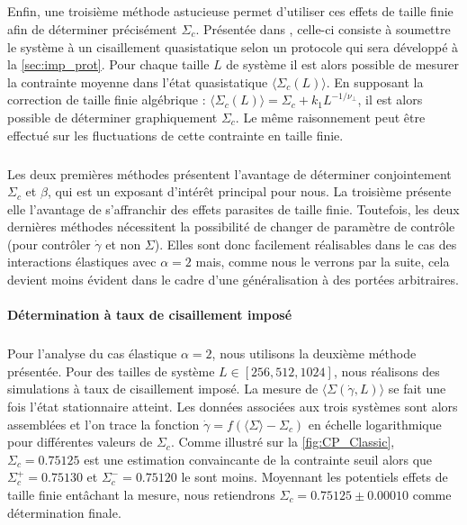\subparagraph{}Enfin, une troisième méthode astucieuse permet d'utiliser ces effets de taille finie afin de déterminer précisément $\Sigma_c$. Présentée dans \cite{lin_scaling_2014}, celle-ci consiste à soumettre le système à un cisaillement quasistatique selon un protocole qui sera développé à la \autoref{sec:imp_prot}. Pour chaque taille $L$ de système il est alors possible de mesurer la contrainte moyenne dans l'état quasistatique $\langle\Sigma_c (L)\rangle$. En supposant la correction de taille finie algébrique : $\langle\Sigma_c (L)\rangle = \Sigma_c+k_1 L^{-1/\nu_\perp}$, il est alors possible de déterminer graphiquement $\Sigma_c$. Le même raisonnement peut être effectué sur les fluctuations de cette contrainte en taille finie.

\subparagraph{}Les deux premières méthodes présentent l'avantage de déterminer conjointement $\Sigma_c$ et $\beta$, qui est un exposant d'intérêt principal pour nous. La troisième présente elle l'avantage de s'affranchir des effets parasites de taille finie. Toutefois, les deux dernières méthodes nécessitent la possibilité de changer de paramètre de contrôle (pour contrôler $\dot{\gamma}$ et non $\Sigma$). Elles sont donc facilement réalisables dans le cas des interactions élastiques avec $\alpha = 2$ mais, comme nous le verrons par la suite, cela devient moins évident dans le cadre d'une généralisation à des portées arbitraires. 

\paragraph{Détermination à taux de cisaillement imposé}

\label{sec:CP_Picard}

\subparagraph{}Pour l'analyse du cas élastique $\alpha = 2$, nous utilisons la deuxième méthode présentée. Pour des tailles de système $L \in [256, 512, 1024]$, nous réalisons des simulations à taux de cisaillement imposé. La mesure de $\langle \Sigma (\dot{\gamma},L)\rangle$ se fait une fois l'état stationnaire atteint. Les données associées aux trois systèmes sont alors assemblées et l'on trace la fonction $\dot{\gamma} = f(\langle \Sigma \rangle - \Sigma_c)$ en échelle logarithmique pour différentes valeurs de $\Sigma_c$. Comme illustré sur la \autoref{fig:CP_Classic}, $\Sigma_c=0.75125$ est une estimation convaincante de la contrainte seuil alors que $\Sigma_c^+=0.75130$ et $\Sigma_c^-=0.75120$ le sont moins. Moyennant les potentiels effets de taille finie entâchant la mesure, nous retiendrons $\Sigma_c=0.75125 \pm 0.00010$ comme détermination finale.

